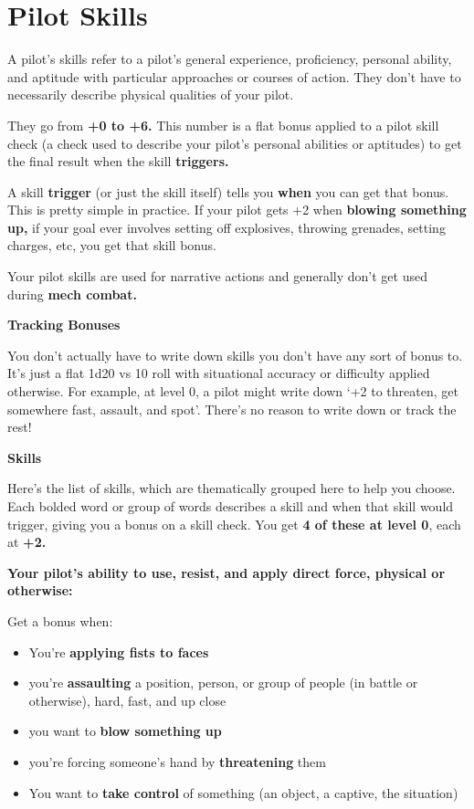 \section{Pilot Skills}

A pilot’s skills refer to a pilot’s general experience, proficiency, personal ability, and aptitude with
particular approaches or courses of action. They don’t have to necessarily describe physical
qualities of your pilot.

They go from \textbf{+0 to +6.} This number is a flat bonus applied to a pilot skill check (a check used to
describe your pilot’s personal abilities or aptitudes) to get the final result
when the skill \textbf{triggers.} 

A skill \textbf{trigger} (or just the skill itself) tells you \textbf{when} you can get that bonus. This is pretty simple in
practice. If your pilot gets +2 when \textbf{blowing something up,} if your goal ever involves setting off
explosives, throwing grenades, setting charges, etc, you get that skill bonus.

Your pilot skills are used for narrative actions and generally don’t get used during \textbf{mech combat.} 

\begin{center}
\textbf{Tracking Bonuses}
\end{center}


You don’t actually have to write down skills you don’t have any sort of bonus to. It’s just a flat
1d20 vs 10 roll with situational accuracy or difficulty applied otherwise. For example, at level 0, a
pilot might write down `+2 to threaten, get somewhere fast, assault, and spot'. There’s no reason
to write down or track the rest!


\begin{center}
\textbf{Skills}
\end{center}

Here’s the list of skills, which are thematically grouped here to help you choose. Each bolded
word or group of words describes a skill and when that skill would trigger, giving you a bonus on a
skill check. You get \textbf{4 of these at level 0}, each at \textbf{+2.} 

\textbf{Your pilot’s ability to use, resist, and apply direct force, physical or otherwise:}

Get a bonus when: 
\begin{itemize}
\item You’re \textbf{applying fists to faces} 
\item you’re \textbf{assaulting} a position, person, or group of people (in battle or otherwise), hard, fast, and up close
\item you want to \textbf{blow something up}
\item you’re forcing someone’s hand by \textbf{threatening} them
\item You want to \textbf{take control} of something (an object, a captive, the situation)
\end{itemize}  


